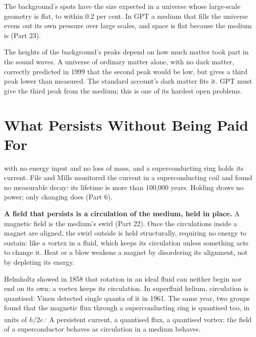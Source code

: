  The background's spots have the size expected in a universe whose large-scale geometry is flat, to within 0.2 per cent. In GPT  a medium that fills the universe evens out its own pressure over large scales, and space is flat because the medium is (Part 23).

 The heights of the background's peaks depend on how much matter took part in the sound waves. A universe of ordinary matter alone, with no dark matter, correctly predicted in 1999 that the second peak would be low, but gives a third peak lower than measured. The standard account's dark matter fits it. GPT must give the third peak from the medium; this is one of its hardest open problems.

\section{What Persists Without Being Paid For}

 with no energy input and no loss of mass, and a superconducting ring holds its current. File and Mills monitored the current in a superconducting coil and found no measurable decay: its lifetime is more than 100,000 years. Holding draws no power; only changing does (Part 6).

\begin{hypbar}
\textbf{A field that persists is a circulation of the medium, held in place.} A magnetic field is the medium's swirl (Part 22).\footnotemark{} Once the circulations inside a magnet are aligned, the swirl outside is held structurally, requiring no energy to sustain: like a vortex in a fluid, which keeps its circulation unless something acts to change it. Heat or a blow weakens a magnet by disordering its alignment, not by depleting its energy.
\end{hypbar}

 Helmholtz showed in 1858 that rotation in an ideal fluid can neither begin nor end on its own: a vortex keeps its circulation. In superfluid helium, circulation is quantised: Vinen detected single quanta of it in 1961. The same year, two groups found that the magnetic flux through a superconducting ring is quantised too, in units of $h/2e$.\textsuperscript{,} A persistent current, a quantised flux, a quantised vortex: the field of a superconductor behaves as circulation in a medium behaves.

